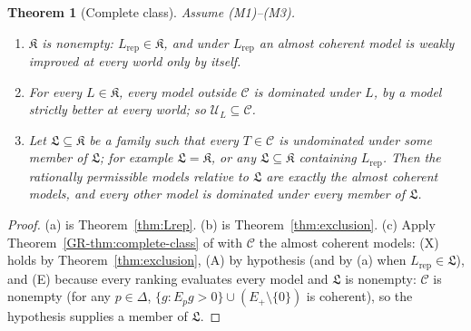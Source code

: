 \documentclass[11pt]{article}
\newtheorem{theorem}{Theorem}[section]
\theoremstyle{definition}
\theoremstyle{remark}
\newcommand{\C}{\mathcal C}
\newcommand{\U}{\mathcal U}
\newcommand{\K}{\mathfrak K}
\newcommand{\Lf}{\mathfrak L}
\newcommand{\Lrep}{L_{\mathrm{rep}}}
\begin{document}
\begin{theorem}[Complete class]\label{thm:main}
Assume (M1)--(M3).
\begin{enumerate}[label=(\alph*)]
\item $\K$ is nonempty: $\Lrep\in\K$, and under $\Lrep$ an almost coherent model is weakly improved at every world only by itself.
\item For every $L\in\K$, every model outside $\C$ is dominated under $L$, by a model strictly better at every world; so $\U_L\subseteq\C$.
\item Let $\Lf\subseteq\K$ be a family such that every $T\in\C$ is undominated under some member of $\Lf$; for example $\Lf=\K$, or any $\Lf\subseteq\K$ containing $\Lrep$. Then the rationally permissible models relative to $\Lf$ are exactly the almost coherent models, and every other model is dominated under every member of $\Lf$.
\end{enumerate}
\end{theorem}
\begin{proof}
(a) is Theorem~\ref{thm:Lrep}. (b) is Theorem~\ref{thm:exclusion}. (c) Apply Theorem~\ref{GR-thm:complete-class} of \cite{KonekGR} with $\C$ the almost coherent models: (X) holds by Theorem~\ref{thm:exclusion}, (A) by hypothesis (and by (a) when $\Lrep\in\Lf$), and (E) because every ranking evaluates every model and $\Lf$ is nonempty: $\C$ is nonempty (for any $p\in\Delta$, $\{g:E_pg>0\}\cup(E_+\setminus\{0\})$ is coherent), so the hypothesis supplies a member of $\Lf$.
\end{proof}



\end{document}
